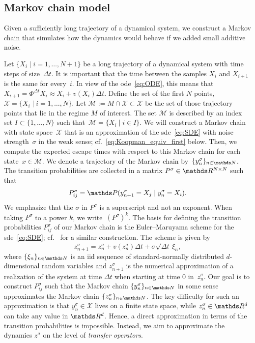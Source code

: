 \subsection{Markov chain model}
\label{sec:sI_Markov_model}

Given a sufficiently long trajectory of a dynamical system, we construct a Markov chain that simulates how the dynamics would behave if we added small additive noise.

Let $\{X_i \mid i=1, \hdots, N+1\}$ be a long trajectory of a dynamical system with time steps of size~$\Delta t$. It is important that the time between the samples $X_i$ and $X_{i+1}$ is the same for every~$i$. In view of the \gls{ode}~\eqref{eq:ODE}, this means that~$X_{i+1} = \Phi^{\Delta t}X_i \approx X_i + v(X_i) \Delta t$. Define the set of the first $N$ points, $\mathcal{X} = \{X_i \mid i=1, \hdots, N\}$.
Let $\mathcal{M}:= M \cap \mathcal{X} \subset \mathcal{X}$ be the set of those trajectory points that lie in the regime $M$ of interest. The set $\mathcal{M}$ is described by an index set $I\subset \{1, \hdots, N\}$ such that~$\mathcal{M} = \{X_i \mid i\in I\}$.
We will construct a Markov chain with state space~$\mathcal{X}$ that is an approximation of the \gls{sde}~\eqref{eq:SDE} with noise strength~$\sigma$ in the weak sense; cf.~\cref{eq:Koopman_equiv_first} below. Then, we compute the expected escape times with respect to this Markov chain for each state~$x\in \mathcal{M}$. We denote a trajectory of the Markov chain by~$\{y_n^\sigma\}_{n\in \N}$. The transition probabilities are collected in a matrix $P^\sigma\in \R^{N\times N}$ such that
\begin{equation*}
    P_{ij}^\sigma = \P(y_{n+1}^\sigma = X_j \mid y_n^\sigma = X_i).
\end{equation*}
We emphasize that the $\sigma$ in $P^\sigma$ is a superscript and not an exponent. When taking $P^\sigma$ to a power $k$, we write~$(P^\sigma)^k$.
The basis for defining the transition probabilities $P_{ij}^\sigma$ of our Markov chain is the Euler--Maruyama scheme \parencite[section~9.1]{kloedenNumericalSolutionSDE1994} for the \gls{sde}~\eqref{eq:SDE}; cf.~\textcite[Sec.~3.2]{koltaiLargeDeviationsSemidistances2018} for a similar construction. The scheme is given by
\begin{equation}\label{eq:Euler_Maruyama}
    z_{n+1}^\sigma = z_n^\sigma + v(z_n^\sigma) \Delta t  +  \sigma \sqrt{\Delta t} \, \xi_n,
\end{equation}
where $\{\xi_n\}_{n\in\N}$ is an \gls{iid} sequence of standard-normally distributed $d$-dimensional random variables and $z_{n+1}^{\sigma}$ is the numerical approximation of a realization of the system at time $\Delta t$ when starting at time 0 in~$z_n^{\sigma}$. Our goal is to construct $P_{ij}^\sigma$ such that the Markov chain $\{y_n^\sigma\}_{n\in \N}$ in some sense approximates the Markov chain $\{z_n^\sigma\}_{n\in \N}$. The key difficulty for such an approximation is that $y_n^\sigma \in \mathcal{X}$ lives on a finite state space, while $z_n^\sigma\in \R^d$ can take any value in $\R^d$. Hence, a direct approximation in terms of the transition probabilities is impossible. Instead, we aim to approximate the dynamics $z^\sigma$ on the level of \emph{transfer operators}.

